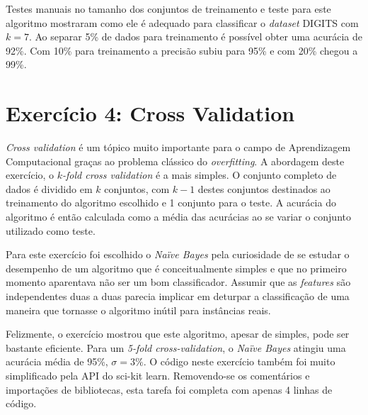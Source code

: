 \documentclass[brazil]{article}
\begin{document}
Testes manuais no tamanho dos conjuntos de treinamento e teste para este
algoritmo mostraram como ele é adequado para classificar o \emph{dataset} DIGITS
com $k = 7$. Ao separar 5\% de dados para treinamento é possível obter uma
acurácia de 92\%. Com 10\% para treinamento a precisão subiu para 95\% e com
20\% chegou a 99\%.

\section{Exercício 4: Cross Validation}

\emph{Cross validation} é um tópico muito importante para o campo de
Aprendizagem Computacional graças ao problema clássico do \emph{overfitting}.
A abordagem deste exercício, o \emph{$k$-fold cross validation} é a mais simples.
O conjunto completo de dados é dividido em $k$ conjuntos, com $k - 1$ destes
conjuntos destinados ao treinamento do algoritmo escolhido e 1 conjunto para
o teste. A acurácia do algoritmo é então calculada como a média das acurácias
ao se variar o conjunto utilizado como teste.

Para este exercício foi escolhido o \emph{Naïve Bayes} pela curiosidade de se
estudar o desempenho de um algoritmo que é conceitualmente simples e que no
primeiro momento aparentava não ser um bom classificador. Assumir que as
\emph{features} são independentes duas a duas parecia implicar em deturpar a
classificação de uma maneira que tornasse o algoritmo inútil para instâncias
reais.

Felizmente, o exercício mostrou que este algoritmo, apesar de simples, pode ser
bastante eficiente. Para um \emph{5-fold cross-validation}, o \emph{Naïve Bayes}
atingiu uma acurácia média de 95\%, $\sigma = 3\%$. O código neste exercício
também foi muito simplificado pela API do sci-kit learn. Removendo-se os
comentários e importações de bibliotecas, esta tarefa foi completa com apenas 4
linhas de código.
\end{document}
